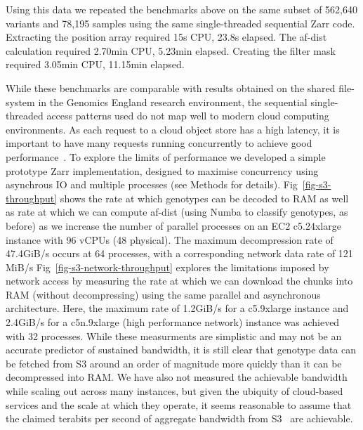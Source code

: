 \documentclass[a4paper,num-refs]{oup-contemporary}
\begin{document}
Using this data we repeated the benchmarks above on the same subset
of 562,640 variants and 78,195 samples using the same
single-threaded sequential Zarr code.
Extracting the position array required 15s CPU, 23.8s elapsed.
The af-dist calculation required 2.70min CPU, 5.23min elapsed.
Creating the filter mask required 3.05min CPU, 11.15min elapsed.

While these benchmarks are comparable with results obtained on the
shared file-system in the Genomics England research environment,
the sequential single-threaded access patterns used do not map
well to modern cloud computing environments.
As each request to a cloud object store has a high latency, it
is important to have many requests running concurrently to achieve
good performance~\citep{durner2023exploiting}.
To explore the limits of performance we developed a simple prototype
Zarr implementation, designed to maximise concurrency using asynchrous
IO and multiple processes (see Methods for details).
Fig~\ref{fig-s3-throughput} shows the rate at which genotypes
can be decoded to RAM as well as rate at which we can compute
af-dist (using Numba to classify genotypes, as before)
as we increase the number of parallel processes on
an EC2 c5.24xlarge instance with 96 vCPUs (48 physical).
The maximum decompression rate of 47.4GiB/s
occurs at 64 processes, with a corresponding
network data rate of 121 MiB/s
Fig~\ref{fig-s3-network-throughput} explores the limitations imposed by
network access by measuring the rate at which we can download the chunks
into RAM (without decompressing) using the same parallel and asynchronous
architecture. Here, the maximum rate of 1.2GiB/s for a c5.9xlarge instance
and 2.4GiB/s for a c5n.9xlarge (high performance network) instance
was achieved with 32 processes. 
While these measurments are simplistic and may not be an 
accurate predictor of sustained bandwidth, it is still clear that 
genotype data can be fetched
from S3 around an order of magnitude more quickly 
than it can be decompressed into RAM. 
We have also not measured
the achievable bandwidth while scaling out across many instances,
but given the ubiquity of cloud-based services and the scale 
at which they operate, it seems reasonable to assume that the claimed
terabits per second of aggregate bandwidth from
S3~\cite{s3-performance-optimising} are achievable.
 
\end{document}

